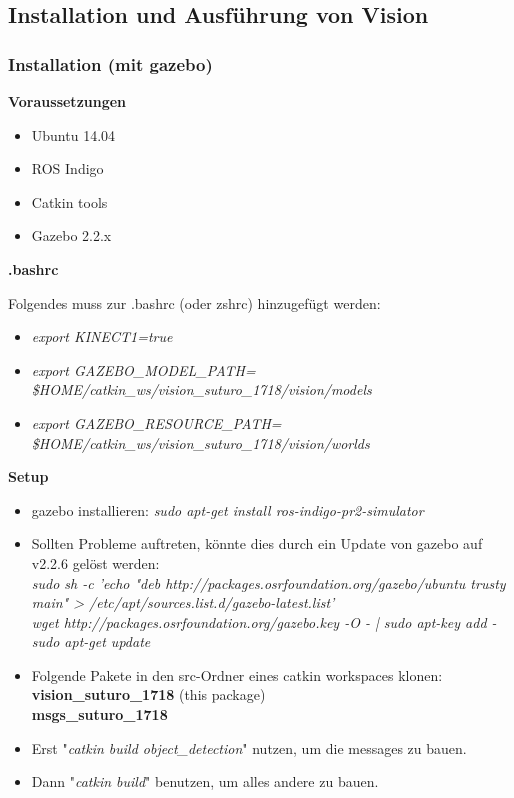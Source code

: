 \documentclass{suturo}
\begin{document}
\subsection{Installation und Ausführung von Vision}

\subsubsection{Installation (mit gazebo)}

\textbf{Voraussetzungen}

\begin{itemize}
\item Ubuntu 14.04
\item ROS Indigo
\item Catkin tools
\item Gazebo 2.2.x
\end{itemize}

\textbf{.bashrc}

Folgendes muss zur .bashrc (oder zshrc) hinzugefügt werden:
\begin{itemize}
\item \textit{export KINECT1=true}
\item \textit{export GAZEBO\_MODEL\_PATH= \$HOME/catkin\_ws/vision\_suturo\_1718/vision/models}
\item \textit{export GAZEBO\_RESOURCE\_PATH= \$HOME/catkin\_ws/vision\_suturo\_1718/vision/worlds}
\end{itemize}

\textbf{Setup}

\begin{itemize}
\item gazebo installieren: \textit{sudo apt-get install ros-indigo-pr2-simulator}

\item Sollten Probleme auftreten, könnte dies durch ein Update von gazebo auf v2.2.6 gelöst werden:
\\
\textit{sudo sh -c 'echo "deb http://packages.osrfoundation.org/gazebo/ubuntu trusty main" > /etc/apt/sources.list.d/gazebo-latest.list'}
\\
\textit{wget http://packages.osrfoundation.org/gazebo.key -O - | sudo apt-key add -}
\\
\textit{sudo apt-get update}

\item Folgende Pakete in den src-Ordner eines catkin workspaces klonen:\\
        \textbf{vision\_suturo\_1718} (this package) \\
        \textbf{msgs\_suturo\_1718}
\item Erst "\textit{catkin build object\_detection}" nutzen, um die messages zu bauen.
\item Dann "\textit{catkin build}" benutzen, um alles andere zu bauen.

\end{itemize}
\end{document}
